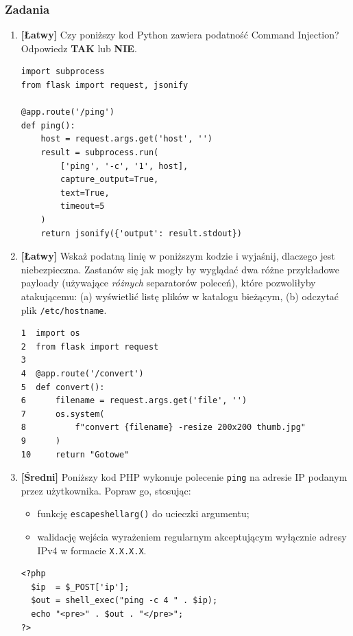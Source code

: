 \documentclass[12pt,a4paper]{article}
\begin{document}
\subsubsection{Zadania}
 
\begin{enumerate}
 
    \item \textbf{[Łatwy]} Czy poniższy kod Python zawiera podatność Command Injection? Odpowiedz \textbf{TAK} lub \textbf{NIE}.
    \begin{tcolorbox}
    \begin{verbatim}
import subprocess
from flask import request, jsonify
 
@app.route('/ping')
def ping():
    host = request.args.get('host', '')
    result = subprocess.run(
        ['ping', '-c', '1', host],
        capture_output=True,
        text=True,
        timeout=5
    )
    return jsonify({'output': result.stdout})
    \end{verbatim}
    \end{tcolorbox}
 
    \item \textbf{[Łatwy]} Wskaż podatną linię w poniższym kodzie i wyjaśnij, dlaczego jest niebezpieczna. Zastanów się jak mogły by wyglądać dwa różne
    przykładowe payloady (używające \emph{różnych} separatorów poleceń), które pozwoliłyby atakującemu:
    (a) wyświetlić listę plików w katalogu bieżącym, (b) odczytać plik \texttt{/etc/hostname}.
    \begin{tcolorbox}
    \begin{verbatim}
1  import os
2  from flask import request
3   
4  @app.route('/convert')
5  def convert():
6      filename = request.args.get('file', '')
7      os.system(
8          f"convert {filename} -resize 200x200 thumb.jpg"
9      )
10     return "Gotowe"
    \end{verbatim}
    \end{tcolorbox}
 
 
    \item \textbf{[Średni]} Poniższy kod PHP wykonuje polecenie
    \texttt{ping} na adresie IP podanym przez użytkownika.
    Popraw go, stosując:
    \begin{itemize}
        \item funkcję \texttt{escapeshellarg()} do ucieczki
              argumentu;
        \item walidację wejścia wyrażeniem regularnym akceptującym
              wyłącznie adresy IPv4 w formacie \texttt{X.X.X.X}.
    \end{itemize}
    \begin{tcolorbox}
    \begin{verbatim}
<?php
  $ip  = $_POST['ip'];
  $out = shell_exec("ping -c 4 " . $ip);
  echo "<pre>" . $out . "</pre>";
?>
    \end{verbatim}
    \end{tcolorbox}
 

\end{enumerate}
\end{document}
